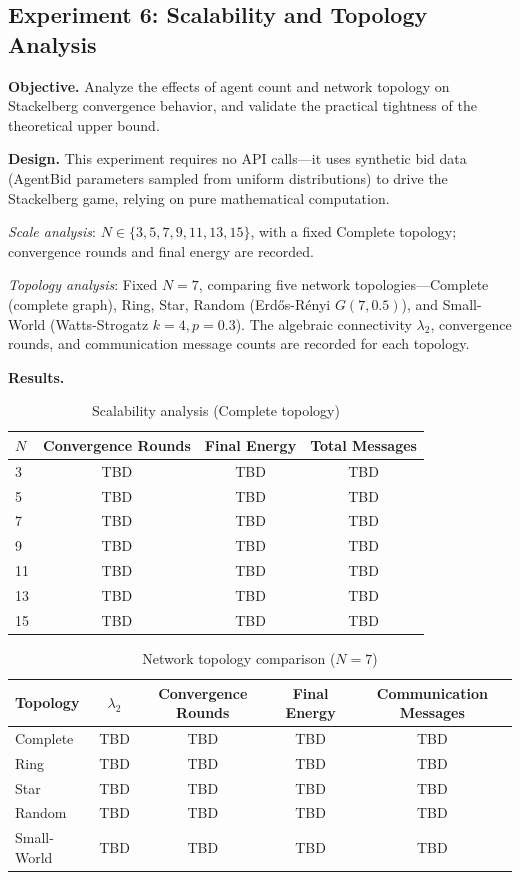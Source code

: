 \documentclass[12pt,a4paper]{article}
\begin{document}
\subsection{Experiment 6: Scalability and Topology Analysis}\label{sec:exp6}

\textbf{Objective.} Analyze the effects of agent count and network topology on Stackelberg convergence behavior, and validate the practical tightness of the theoretical upper bound.

\textbf{Design.} This experiment requires no API calls---it uses synthetic bid data (AgentBid parameters sampled from uniform distributions) to drive the Stackelberg game, relying on pure mathematical computation.

\textit{Scale analysis}: $N \in \{3, 5, 7, 9, 11, 13, 15\}$, with a fixed Complete topology; convergence rounds and final energy are recorded.

\textit{Topology analysis}: Fixed $N = 7$, comparing five network topologies---Complete (complete graph), Ring, Star, Random (Erd\H{o}s-R\'{e}nyi $G(7, 0.5)$), and Small-World (Watts-Strogatz $k=4, p=0.3$). The algebraic connectivity $\lambda_2$, convergence rounds, and communication message counts are recorded for each topology.

\textbf{Results.}

\begin{table}[H]
\centering
\caption{Scalability analysis (Complete topology)}\label{tab:exp6_scale}
\begin{tabular}{lccc}
\toprule
$N$ & Convergence Rounds & Final Energy & Total Messages \\
\midrule
3 & TBD & TBD & TBD \\
5 & TBD & TBD & TBD \\
7 & TBD & TBD & TBD \\
9 & TBD & TBD & TBD \\
11 & TBD & TBD & TBD \\
13 & TBD & TBD & TBD \\
15 & TBD & TBD & TBD \\
\bottomrule
\end{tabular}
\end{table}

\begin{table}[H]
\centering
\caption{Network topology comparison ($N=7$)}\label{tab:exp6_topo}
\begin{tabular}{lcccc}
\toprule
Topology & $\lambda_2$ & Convergence Rounds & Final Energy & Communication Messages \\
\midrule
Complete & TBD & TBD & TBD & TBD \\
Ring & TBD & TBD & TBD & TBD \\
Star & TBD & TBD & TBD & TBD \\
Random & TBD & TBD & TBD & TBD \\
Small-World & TBD & TBD & TBD & TBD \\
\bottomrule
\end{tabular}
\end{table}
\end{document}
